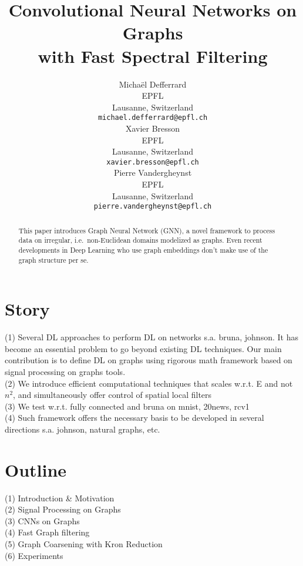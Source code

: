 \documentclass{article}
\title{Convolutional Neural Networks on Graphs\\ with Fast Spectral Filtering}
\author{
  Michaël Defferrard \\ %
  EPFL \\
  Lausanne, Switzerland \\
  \texttt{michael.defferrard@epfl.ch} \\
  \And %
  Xavier Bresson \\
  EPFL \\
  Lausanne, Switzerland \\
  \texttt{xavier.bresson@epfl.ch} \\
  \And
  Pierre Vandergheynst \\
  EPFL \\
  Lausanne, Switzerland \\
  \texttt{pierre.vandergheynst@epfl.ch} \\
}
\begin{document}

\maketitle

\begin{abstract}
This paper introduces Graph Neural Network (GNN), a novel framework to process
data on irregular, i.e.~non-Euclidean domains modelized as graphs. Even recent
developments in Deep Learning who use graph embeddings don't make use of the
graph structure per se.
\end{abstract}



\section{Story}
(1) Several DL approaches to perform DL on networks s.a. bruna, johnson. It has become an essential problem to go beyond existing DL techniques. Our main contribution is to define DL on graphs using rigorous math framework based on signal processing on graphs tools.  \\
(2) We introduce efficient computational techniques that scales w.r.t. E and not $n^2$, and simultaneously offer control of spatial local filters\\
(3) We test w.r.t. fully connected and bruna on mnist, 20news, rcv1\\
(4) Such framework offers the necessary basis to be developed in several directions s.a. johnson, natural graphs, etc.\\



\section{Outline}
(1) Introduction \& Motivation\\
(2) Signal Processing on Graphs\\
(3) CNNs on Graphs\\
(4) Fast Graph filtering\\
(5) Graph Coarsening with Kron Reduction\\
(6) Experiments\\


\end{document}
